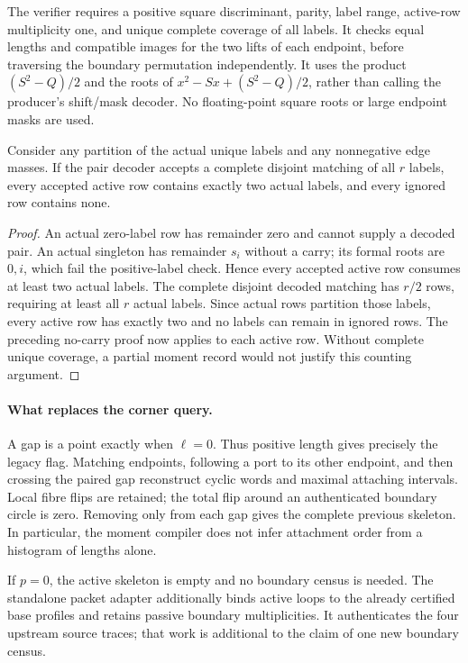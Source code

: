The verifier requires a positive square discriminant, parity, label range,
active-row multiplicity one, and unique complete coverage of all labels.
It checks equal lengths and compatible images for the two lifts of each
endpoint, before traversing the boundary permutation independently. It
uses the product $(S^2-Q)/2$ and the roots of $x^2-Sx+(S^2-Q)/2$, rather than
calling the producer's shift/mask decoder. No floating-point square roots
or large endpoint masks are used.

\begin{proposition}
Consider any partition of the actual unique labels and any nonnegative edge
masses. If the pair decoder accepts a complete disjoint matching of all $r$
labels, every accepted active row contains exactly two actual labels, and
every ignored row contains none.
\end{proposition}
\begin{proof}
An actual zero-label row has remainder zero and cannot supply a decoded
pair. An actual singleton has remainder $s_i$ without a carry; its formal
roots are $0,i$, which fail the positive-label check. Hence every accepted
active row consumes at least two actual labels. The complete disjoint
decoded matching has $r/2$ rows, requiring at least all $r$ actual labels.
Since actual rows partition those labels, every active row has exactly two
and no labels can remain in ignored rows. The preceding no-carry proof now
applies to each active row. Without complete unique coverage, a partial
moment record would not justify this counting argument.
\end{proof}

\paragraph{What replaces the corner query.}
A gap is a point exactly when $\ell=0$. Thus positive length gives precisely
the legacy  flag. Matching endpoints, following
a port to its other endpoint, and then crossing the paired gap reconstruct
cyclic words and maximal attaching intervals. Local fibre flips are retained;
the total flip around an authenticated boundary circle is zero. Removing
only  from each gap gives the complete previous
skeleton. In particular, the moment compiler does not infer attachment
order from a histogram of lengths alone.

If $p=0$, the active skeleton is empty and no boundary census is needed.
The standalone packet adapter additionally binds active loops to the
already certified base profiles and retains passive boundary multiplicities.
It authenticates the four upstream source traces; that work is additional
to the claim of one new boundary census.


